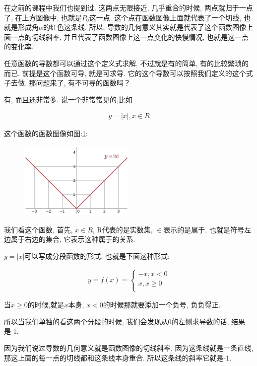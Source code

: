 在之前的课程中我们也提到过. 这两点无限接近, 几乎重合的时候, 两点就归于一点了, 在上方图像中, 也就是$P_0$这一点. 这个点在函数图像上面就代表了一个切线, 也就是形成角$\alpha$的红色这条线. 所以, 导数的几何意义其实就是代表了这个函数图像上面一点的切线斜率, 并且代表了函数图像上这一点变化的快慢情况, 也就是这一点的变化率. 

任意函数的导数都可以通过这个定义式求解, 不过就是有的简单, 有的比较繁琐的而已. 前提是这个函数可导, 就是可求导. 它的这个导数可以按照我们定义的这个式子去做. 那问题来了, 有不可导的函数吗？

有, 而且还非常多. 说一个非常常见的,比如

\begin{align*}
  y=|x|, x \in R
\end{align*}

这个函数的函数图像如图:\ref{fig:img10_2}: 

\begin{figure}[ht]
  \centering
  \includegraphics[width=0.5\textwidth]{asset/22572127-4cbd-4f9d-88bc-7ded3cd6940f.png}
  \caption{}
  \label{fig:img10_2}
\end{figure}

我们看这个函数, 首先, $x\in R$, R代表的是实数集, $\in$表示的是属于, 也就是符号左边属于右边的集合, 它表示这种属于的关系. 

$y=|x|$可以写成分段函数的形式, 也就是下面这种形式: 

\begin{align*}
  y = f(x) =
  \begin{cases}
  -x, x<0 \\
  x, x \geq 0 \\
  \end{cases}
\end{align*}

当$x \geq 0$的时候,就是$x$本身, $x<0$的时候那就要添加一个负号, 负负得正. 

所以当我们单独的看这两个分段的时候, 我们会发现从0的左侧求导数的话, 结果是-1. 

因为我们说过导数的几何意义就是函数图像的切线斜率. 因为这条线就是一条直线, 那这上面的每一点的切线都和这条线本身重合. 所以这条线的斜率它就是-1. 

